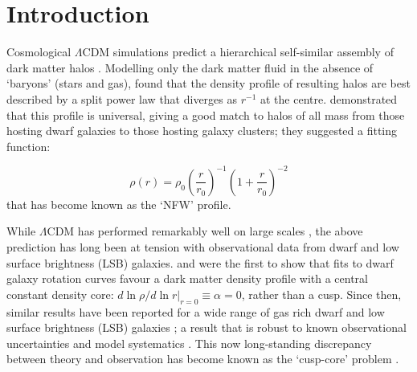 \section{Introduction}\label{sec:introduction}


Cosmological $\Lambda$CDM simulations predict a hierarchical
self-similar assembly of dark matter halos
\citep[e.g.][]{WhiteRees1978, NavarroFrenkWhite1996}. Modelling only
the dark matter fluid in the absence of `baryons' (stars and gas),
\citet{DubinskiCarlberg1991} found that the density profile of
resulting halos are best described by a split power law that diverges
as $r^{-1}$ at the centre. \citet{NavarroFrenkWhite1996} demonstrated
that this profile is universal, giving a good match to
halos of all mass from those hosting dwarf galaxies to those hosting
galaxy clusters; they suggested a fitting function:

\begin{equation} 
    \rho(r) = \rho_0 \left(\frac{r}{r_0}\right)^{-1}\left(1 + \frac{r}{r_0}\right)^{-2}
    \label{eqn:nfw}
\end{equation} 
that has become known as the `NFW' profile. 

While $\Lambda$CDM has performed remarkably well on large scales
\citep[e.g.][]{2002PhRvD..66j3508T}, the above prediction has long been at
tension with observational data from dwarf and low surface brightness (LSB)
galaxies. \citet{FloresPrimack1994} and \citet{Moore1994} were the first to show
that fits to dwarf galaxy rotation curves favour a dark matter density profile
with a central constant density core: $\left. d\ln \rho / d\ln r\right|_{r=0}
\equiv \alpha = 0$, rather than a cusp. Since then, similar results have been
reported for a wide range of gas rich dwarf and low surface brightness (LSB)
galaxies \citep[e.g.][]{DeBlok+2001, McGaugh+2001, DeBlok+2008,
  HagueWilkinson2014}; a result that is robust to known observational
uncertainties and model systematics
\citep[e.g.][]{KuzioDeNarayKaufmann2011}. This now long-standing discrepancy
between theory and observation has become known as the `cusp-core' problem
\citep[for a review see e.g.][]{DeBlok2010}.

